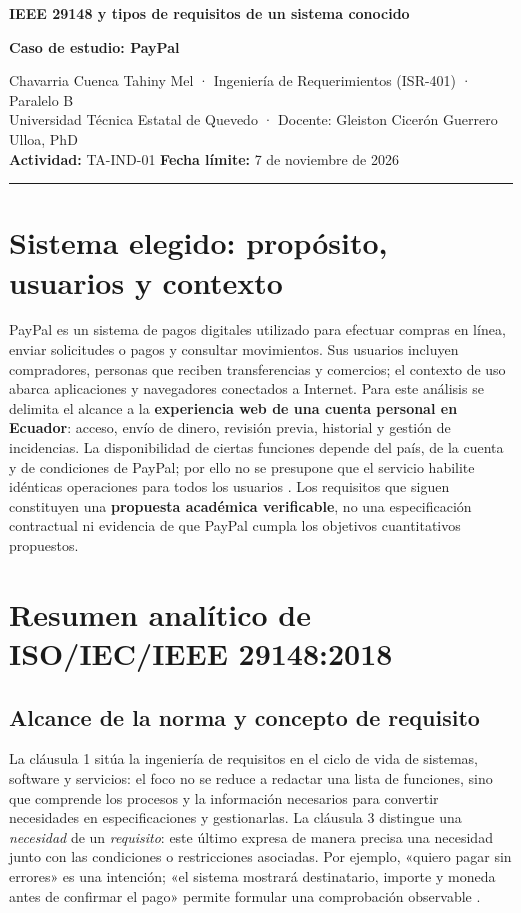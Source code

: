 \documentclass[10pt,a4paper]{extarticle}
\begin{document}
\begin{center}
{\large\bfseries\color{uteq} IEEE 29148 y tipos de requisitos de un sistema conocido}\par
{\normalsize\bfseries Caso de estudio: PayPal}\par
\small Chavarria Cuenca Tahiny Mel · Ingeniería de Requerimientos (ISR-401) · Paralelo B\\
Universidad Técnica Estatal de Quevedo · Docente: Gleiston Cicerón Guerrero Ulloa, PhD\\
\textbf{Actividad:} TA-IND-01 \quad \textbf{Fecha límite:} 7 de noviembre de 2026
\end{center}
\vspace{-5pt}\hrule\vspace{4pt}

\section{Sistema elegido: propósito, usuarios y contexto}
PayPal es un sistema de pagos digitales utilizado para efectuar compras en línea, enviar solicitudes o pagos y consultar movimientos. Sus usuarios incluyen compradores, personas que reciben transferencias y comercios; el contexto de uso abarca aplicaciones y navegadores conectados a Internet. Para este análisis se delimita el alcance a la \textbf{experiencia web de una cuenta personal en Ecuador}: acceso, envío de dinero, revisión previa, historial y gestión de incidencias. La disponibilidad de ciertas funciones depende del país, de la cuenta y de condiciones de PayPal; por ello no se presupone que el servicio habilite idénticas operaciones para todos los usuarios \cite{paypalenvio,paypalrecibir}. Los requisitos que siguen constituyen una \textbf{propuesta académica verificable}, no una especificación contractual ni evidencia de que PayPal cumpla los objetivos cuantitativos propuestos.

\section{Resumen analítico de ISO/IEC/IEEE 29148:2018}
\subsection{Alcance de la norma y concepto de requisito}
La cláusula 1 sitúa la ingeniería de requisitos en el ciclo de vida de sistemas, software y servicios: el foco no se reduce a redactar una lista de funciones, sino que comprende los procesos y la información necesarios para convertir necesidades en especificaciones y gestionarlas. La cláusula 3 distingue una \emph{necesidad} de un \emph{requisito}: este último expresa de manera precisa una necesidad junto con las condiciones o restricciones asociadas. Por ejemplo, «quiero pagar sin errores» es una intención; «el sistema mostrará destinatario, importe y moneda antes de confirmar el pago» permite formular una comprobación observable \cite[cláusulas 1 y 3.1.19]{iso29148}.
\end{document}
